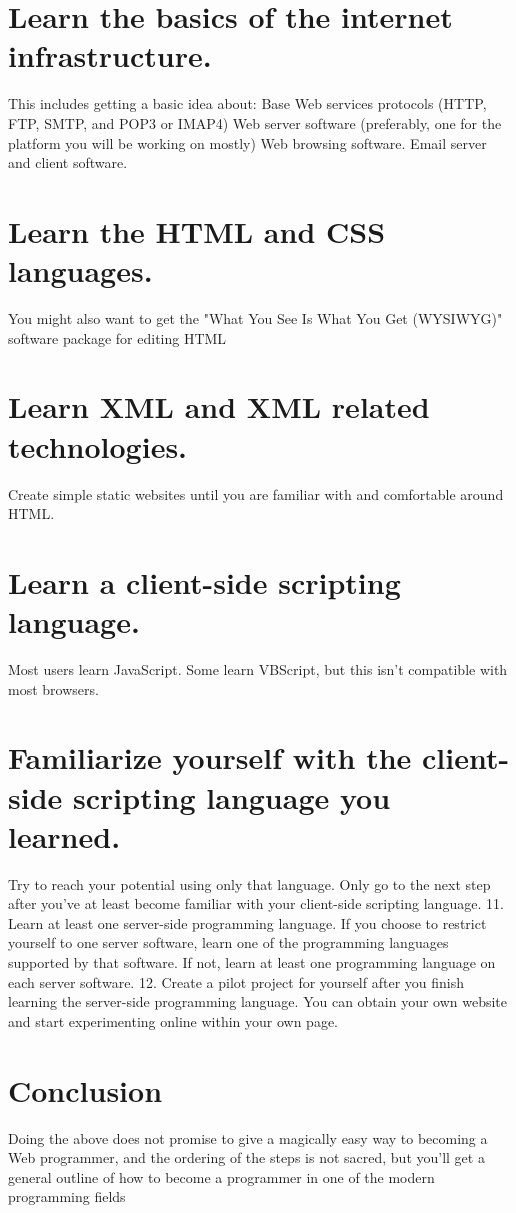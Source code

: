 \documentclass[options]{article}
\begin{document}
\section{\textbf{Learn the basics of the internet infrastructure.}} 
This includes getting a basic idea about:
    Base Web services protocols (HTTP, FTP, SMTP, and POP3 or IMAP4)
    Web server software (preferably, one for the platform you will be working on mostly)
    Web browsing software. 
    Email server and client software.

\section{\textbf{Learn the HTML and CSS languages. }}
You might also want to get the "What You See Is What You Get (WYSIWYG)" software package for editing HTML


\section{\textbf{Learn XML and XML related technologies.}}
Create simple static websites until you are familiar with and comfortable around HTML.

\section{\textbf{Learn a client-side scripting language. }}
Most users learn JavaScript. Some learn VBScript, but this isn't compatible with most browsers.
\section{\textbf{Familiarize yourself with the client-side scripting language you learned. }}
Try to reach your potential using only that language. Only go to the next step after you've at least become familiar with your client-side scripting language.
11. Learn at least one server-side programming language. 
If you choose to restrict yourself to one server software, learn one of the programming languages supported by that software. If not, learn at least one programming language on each server software.
12. Create a pilot project for yourself after you finish learning the server-side programming language. You can obtain your own website and start experimenting online within your own page.
	\section{\textbf{Conclusion}}
Doing the above does not promise to give a magically easy way to becoming a Web programmer, and the ordering of the steps is not sacred, but you'll get a general outline of how to become a programmer in one of the modern programming fields
\end{document}
